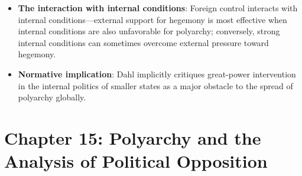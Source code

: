 \documentclass[12pt]{article}
\begin{document}
\begin{itemize}[leftmargin=*, itemsep=4pt]
    \item \textbf{The interaction with internal conditions}: Foreign control interacts with internal conditions---external support for hegemony is most effective when internal conditions are also unfavorable for polyarchy; conversely, strong internal conditions can sometimes overcome external pressure toward hegemony.
    \item \textbf{Normative implication}: Dahl implicitly critiques great-power intervention in the internal politics of smaller states as a major obstacle to the spread of polyarchy globally.
\end{itemize}

\section{Chapter 15: Polyarchy and the Analysis of Political Opposition}
\end{document}

